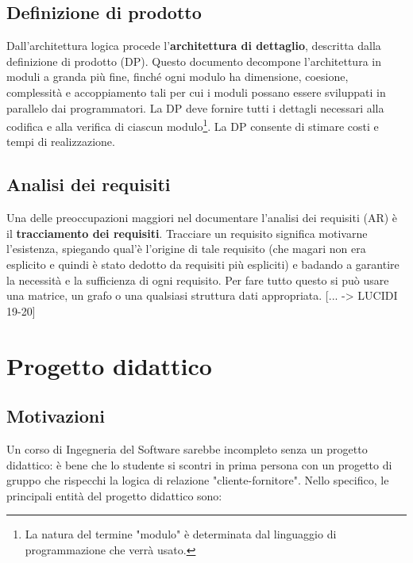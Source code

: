 \documentclass[a4paper]{article}
\begin{document}
		
	\subsection{Definizione di prodotto}

		
Dall'architettura logica procede l'\textbf{architettura di dettaglio}, descritta dalla definizione di prodotto (DP). Questo documento decompone l'architettura in moduli a granda più fine, finché ogni modulo ha dimensione, coesione, complessità e accoppiamento tali per cui i moduli possano essere sviluppati in parallelo dai programmatori. La DP deve fornire tutti i dettagli necessari alla codifica e alla verifica di ciascun modulo\footnote{La natura del termine "modulo" è determinata dal linguaggio di programmazione che verrà usato.}. La DP consente di stimare costi e tempi di realizzazione.

		
	\subsection{Analisi dei requisiti}

		
Una delle preoccupazioni maggiori nel documentare l'analisi dei requisiti (AR) è il \textbf{tracciamento dei requisiti}. Tracciare un requisito significa motivarne l'esistenza, spiegando qual'è l'origine di tale requisito (che magari non era esplicito e quindi è stato dedotto da requisiti più espliciti) e badando a garantire la necessità e la sufficienza di ogni requisito. Per fare tutto questo si può usare una matrice, un grafo o una qualsiasi struttura dati appropriata. [... -> LUCIDI 19-20]
	


		
	\section{Progetto didattico}


		
	\subsection{Motivazioni}

		
Un corso di Ingegneria del Software sarebbe incompleto senza un progetto didattico: è bene che lo studente si scontri in prima persona con un progetto di gruppo che rispecchi la logica di relazione "cliente-fornitore". Nello specifico, le principali entità del progetto didattico sono:
		
\end{document}
